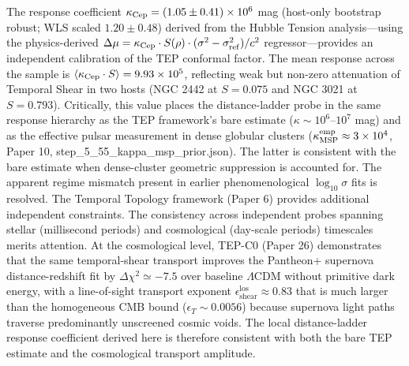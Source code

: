 \documentclass[
]{article}
\begin{document}
The response coefficient
\(\kappa_{\rm Cep} = (1.05 \pm 0.41)\times10^6\) mag (host-only
bootstrap robust; WLS scaled \(1.20 \pm 0.48\)) derived from the Hubble
Tension analysis---using the physics-derived
\(\Delta\mu = \kappa_{\rm Cep}\cdot S(\rho)\cdot(\sigma^2-\sigma_{\rm ref}^2)/c^2\)
regressor---provides an independent calibration of the TEP conformal
factor. The mean response across the sample is
\(\langle \kappa_{\rm Cep} \cdot S \rangle = 9.93\times10^5\),
reflecting weak but non-zero attenuation of Temporal Shear in two hosts
(NGC 2442 at \(S = 0.075\) and NGC 3021 at \(S = 0.793\)). Critically,
this value places the distance-ladder probe in the same response
hierarchy as the TEP framework's bare estimate
(\(\kappa \sim 10^6\)--\(10^7\) mag) and as the effective pulsar
measurement in dense globular clusters
(\(\kappa_{\rm MSP}^{\rm emp} \approx 3 \times 10^4\), Paper 10,
step\_5\_55\_kappa\_msp\_prior.json). The latter is consistent with the
bare estimate when dense-cluster geometric suppression is accounted for.
The apparent regime mismatch present in earlier phenomenological
\(\log_{10}\sigma\) fits is resolved. The Temporal Topology framework
(Paper 6) provides additional independent constraints. The consistency
across independent probes spanning stellar (millisecond periods) and
cosmological (day-scale periods) timescales merits attention. At the
cosmological level, TEP-C0 (Paper 26) demonstrates that the same
temporal-shear transport improves the Pantheon+ supernova
distance-redshift fit by \(\Delta\chi^2 \simeq -7.5\) over baseline
\(\Lambda\)CDM without primitive dark energy, with a line-of-sight
transport exponent \(\epsilon_{\text{shear}}^{\text{los}} \approx 0.83\)
that is much larger than the homogeneous CMB bound
(\(\epsilon_T \sim 0.0056\)) because supernova light paths traverse
predominantly unscreened cosmic voids. The local distance-ladder
response coefficient derived here is therefore consistent with both the
bare TEP estimate and the cosmological transport amplitude.
\end{document}

